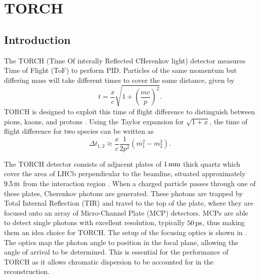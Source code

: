 % 

\chapter{\label{ch:3-TORCH}TORCH}

\minitoc

\section{Introduction}

The TORCH (Time Of interally Reflected CHerenkov light) detector measures Time of Flight (ToF) to perform PID. Particles of the same momentum but differing mass will take different times to cover the same distance, given by
\begin{equation}
t = \frac{x}{c} \sqrt{1 + \left(\frac{mc}{p}\right)^{2}}.
\end{equation}
TORCH is designed to exploit this time of flight difference to distinguish between pions, kaons, and protons \cite{vanDijk_2016}. Using the Taylor expansion for $\sqrt{1+x}$, the time of flight difference for two species can be written as
\begin{equation}
\Delta t_{1,2} \approx \frac{x}{c}\frac{1}{2p^{2}} (m_{1}^{2} - m_{2}^{2}).
\end{equation}

The TORCH detector consists of adjacent plates of $1\,\rm{mm}$ thick quartz which cover the area of LHCb perpendicular to the beamline, situated approximately $9.5\,\rm{m}$ from the interaction region \cite{vanDijk_2016}. 
When a charged particle passes through one of these plates, Cherenkov photons are generated. These photons are trapped by Total Internal Reflection (TIR) and travel  to the top of the plate, where they are focused onto an array of Micro-Channel Plate (MCP) detectors.  MCPs are able to detect single photons with excellent resolution, typically $50\,\rm{ps}$, thus making them an idea choice for TORCH. The setup of the focusing optics is shown in . The optics map the photon angle to position in the focal plane, allowing the angle of arrival to be determined. This is essential for the performance of TORCH as it allows chromatic dispersion to be accounted for in the reconstruction.

